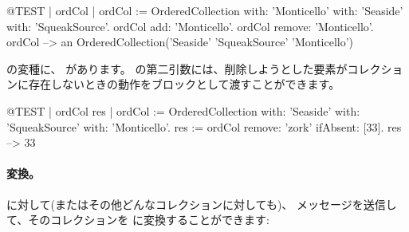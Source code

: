 \documentclass[a4paper,10pt,twoside]{book}
\begin{document}
\begin{code}{@TEST | ordCol | ordCol := OrderedCollection with: 'Monticello' with: 'Seaside' with: 'SqueakSource'.}
ordCol add: 'Monticello'.
ordCol remove: 'Monticello'.
ordCol --> an OrderedCollection('Seaside' 'SqueakSource' 'Monticello')
\end{code}

 の変種に、 があります。
の第二引数には、削除しようとした要素がコレクションに存在しないときの動作をブロックとして渡すことができます。

\begin{code}{@TEST | ordCol res | ordCol := OrderedCollection with: 'Seaside' with: 'SqueakSource' with: 'Monticello'.}
res := ordCol remove: 'zork' ifAbsent: [33].
res --> 33
\end{code}

\paragraph{変換。}
 に対して(またはその他どんなコレクションに対しても)、 メッセージを送信して、そのコレクションを  に変換することができます:




\end{document}
